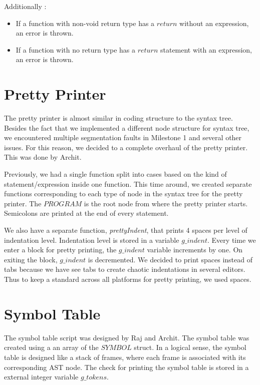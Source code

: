 \documentclass[preprint,12pt]{elsarticle}
\begin{document}
Additionally : 
\begin{itemize}
\item If a function with non-void return type has a $return$ without an expression, an error is thrown.
\item If a function with no return type has a $return$ statement with an expression, an error is thrown.
\end{itemize}

\section{Pretty Printer}

The pretty printer is almost similar in coding structure to the syntax tree. Besides the fact that we implemented a different node structure for syntax tree,  we encountered multiple segmentation faults in Milestone 1 and several other issues. For this reason, we decided to a complete overhaul of the pretty printer. This was done by Archit. 

Previously, we had a single function split into cases based on the kind of statement/expression inside one function. This time around, we created separate functions corresponding to each type of node in the syntax tree for the pretty printer. The $PROGRAM$ is the root node from where the pretty printer starts. Semicolons are printed at the end of every statement.

We also have a separate function, \textit{prettyIndent}, that prints 4 spaces per level of indentation level. Indentation level is stored in a variable $g\_indent$. Every time we enter a block for pretty printing, the $g\_indent$ variable increments by one. On exiting the block, $g\_indent$ is decremented. We decided to print spaces instead of tabs because we have see tabs to create chaotic indentations in several editors. Thus to keep a standard across all platforms for pretty printing, we used spaces.


\section{Symbol Table}

The symbol table script was designed by Raj and Archit. The symbol table was created using a an array of the $SYMBOL$ struct. In a logical sense, the symbol table is designed like a stack of frames, where each frame is associated with its corresponding AST node. The check for printing the symbol table is stored in a external integer variable $g\_tokens$. 
\end{document}
